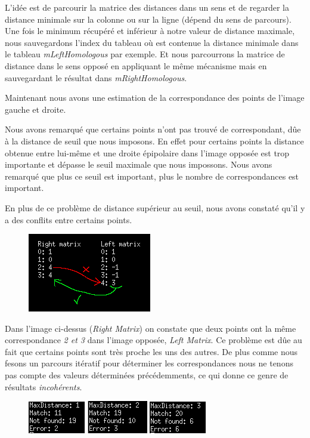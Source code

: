 \documentclass[a4paper,12pt]{report}
\begin{document}
L'idée est de parcourir la matrice des distances dans un sens et de regarder la distance minimale sur la colonne ou sur la ligne (dépend du sens de parcours). Une fois le minimum récupéré et inférieur à notre valeur de distance maximale, nous sauvegardons l'index du tableau où est contenue la distance minimale dans le tableau \textit{mLeftHomologous} par exemple. Et nous parcourrons la matrice de distance dans le sens opposé en appliquant le même mécanisme mais en sauvegardant le résultat dans \textit{mRightHomologous}.

Maintenant nous avons une estimation de la correspondance des points de l'image gauche et droite.

Nous avons remarqué que certains points n'ont pas trouvé de correspondant, dûe à la distance de seuil que nous imposons. En effet pour certains points la distance obtenue entre lui-même et une droite épipolaire dans l'image opposée est trop importante et dépasse le seuil maximale que nous impossons. Nous avons remarqué que plus ce seuil est important, plus le nombre de correspondances est important.

En plus de ce problème de distance supérieur au seuil, nous avons constaté qu'il y a des conflits entre certains points.

\begin{figure}[!ht]
	\center
	\includegraphics[scale=0.8]{./image/resultincorrect.png}
\end{figure}

Dans l'image ci-dessus (\textit{Right Matrix}) on constate que deux points ont la même correspondance \textit{2 et 3} dans l'image opposée, \textit{Left Matrix}. Ce problème est dûe au fait que certains points sont très proche les uns des autres. De plus comme nous fesons un parcours itératif pour déterminer les correspondances nous ne tenons pas compte des valeurs déterminées précédemments, ce qui donne ce genre de résultats \textit{incohérents}.

\begin{figure}[!ht]
	\center
	\includegraphics[scale=1]{./image/result.png}
	\includegraphics[scale=1]{./image/result2.png}
	\includegraphics[scale=1]{./image/result1.png}
\end{figure}
\end{document}
